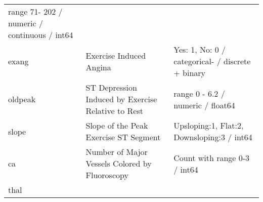 \documentclass[11pt]{article}
\begin{document}
\begin{longtable}[]{@{}lll@{}}
\begin{minipage}[t]{0.38\columnwidth}
range 71- 202 / numeric / continuous / int64\strut
\end{minipage}\tabularnewline
\begin{minipage}[t]{0.09\columnwidth}\raggedright\strut
exang\strut
\end{minipage} & \begin{minipage}[t]{0.44\columnwidth}\raggedright\strut
Exercise Induced Angina\strut
\end{minipage} & \begin{minipage}[t]{0.38\columnwidth}\raggedright\strut
Yes: 1, No: 0 / categorical- / discrete + binary\strut
\end{minipage}\tabularnewline
\begin{minipage}[t]{0.09\columnwidth}\raggedright\strut
oldpeak\strut
\end{minipage} & \begin{minipage}[t]{0.44\columnwidth}\raggedright\strut
ST Depression Induced by Exercise Relative to Rest\strut
\end{minipage} & \begin{minipage}[t]{0.38\columnwidth}\raggedright\strut
range 0 - 6.2 / numeric / float64\strut
\end{minipage}\tabularnewline
\begin{minipage}[t]{0.09\columnwidth}\raggedright\strut
slope\strut
\end{minipage} & \begin{minipage}[t]{0.44\columnwidth}\raggedright\strut
Slope of the Peak Exercise ST Segment\strut
\end{minipage} & \begin{minipage}[t]{0.38\columnwidth}\raggedright\strut
Upsloping:1, Flat:2, Downsloping:3 / int64\strut
\end{minipage}\tabularnewline
\begin{minipage}[t]{0.09\columnwidth}\raggedright\strut
ca\strut
\end{minipage} & \begin{minipage}[t]{0.44\columnwidth}\raggedright\strut
Number of Major Vessels Colored by Fluoroscopy\strut
\end{minipage} & \begin{minipage}[t]{0.38\columnwidth}\raggedright\strut
Count with range 0-3 / int64\strut
\end{minipage}\tabularnewline
\begin{minipage}[t]{0.09\columnwidth}\raggedright\strut
thal\strut
\end{minipage} & \begin{minipage}[t]{0.44\columnwidth}\raggedright\strut

\end{minipage}
\end{longtable}
\end{document}
